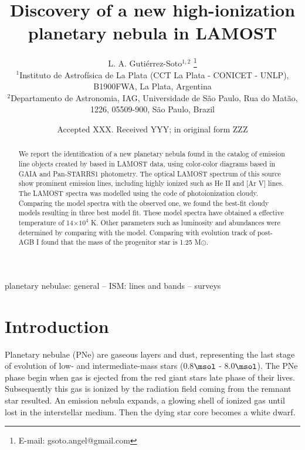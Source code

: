 \documentclass[fleqn,usenatbib]{mnras}
\title[New high-ionization planetary nebula]{Discovery of a new high-ionization planetary nebula in LAMOST}
\author[Guti\'errez-Soto et al.]{
  L. A. Guti\'errez-Soto$^{1,2}$
  \thanks{E-mail: gsoto.angel@gmail.com}
\\
$^{1}$Instituto de Astrof\'{i}sica de La Plata (CCT La Plata - CONICET - UNLP), B1900FWA, La Plata, Argentina\\
$^{2}$Departamento de Astronomia, IAG, Universidade de S\~{a}o Paulo, Rua do Mat\~{a}o, 1226, 05509-900, S\~{a}o Paulo, Brazil\\
}
\date{Accepted XXX. Received YYY; in original form ZZZ}
\begin{document}
\label{firstpage}
\pagerange{\pageref{firstpage}--\pageref{lastpage}}
\maketitle

\begin{abstract}
  We report the identification of a new planetary nebula found in the catalog of
  emission line objects created by \citet{Skoda:2020} based in LAMOST data, using
  color-color diagrams based in GAIA and Pan-STARRS1 photometry. The optical LAMOST
  spectrum of this source show prominent emission lines, including highly ionized
  such as He II and [Ar V] lines. The LAMOST spectra was
  modelled using the code of photoionization  {\sc cloudy}.
  Comparing the model spectra with the observed one, we found
  the best-fit {\sc cloudy} models resulting in three best model fit. These model spectra have
   obtained a
  effective temperature of 14$\times10^{4}$ K. Other parameters such as luminosity
  and abundances were determined by comparing with the model.
  Comparing with evolution track of post-AGB I found that the mass
  of the progenitor star is 1.25 M{$\odot$}. 
\end{abstract}

\begin{keywords}
planetary nebulae: general -- ISM: lines and bands -- surveys
\end{keywords}



\section{Introduction}

\label{sec:intro}

Planetary nebulae (PNe) are gaseous layers and dust, representing the last stage of
evolution of low- and intermediate-mass stars (0.8$\msol$ - 8.0$\msol$). The PNe phase begin when
gas is ejected from the red giant stars late phase of their lives. Subsequently this
gas is ionized by the radiation field coming from the remnant
star resulted. An emission nebula expands, a glowing shell of ionized gas until lost in the
interstellar medium. Then the dying star core becomes a white dwarf.
\end{document}
